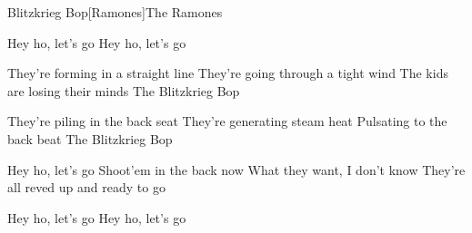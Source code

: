 \begin{Song}{Blitzkrieg Bop}[Ramones]{The Ramones}

\begin{Verse}
Hey ho, let's go
Hey ho, let's go
\espaceInterStrophe

They're forming in a straight line
They're going through a tight wind
The kids are losing their minds
The Blitzkrieg Bop
\espaceInterStrophe

They're piling in the back seat
They're generating steam heat
Pulsating to the back beat
The Blitzkrieg Bop
\end{Verse}
\espaceInterStrophe

\begin{Chorus}
Hey ho, let's go
Shoot'em in the back now
What they want, I don't know
They're all reved up and ready to go
\end{Chorus}
\espaceInterStrophe

\espaceInterStrophe

\tochorus
\espaceInterStrophe

\espaceInterStrophe

\begin{Verse}
Hey ho, let's go
Hey ho, let's go
\end{Verse}

\vfill

\end{Song}



